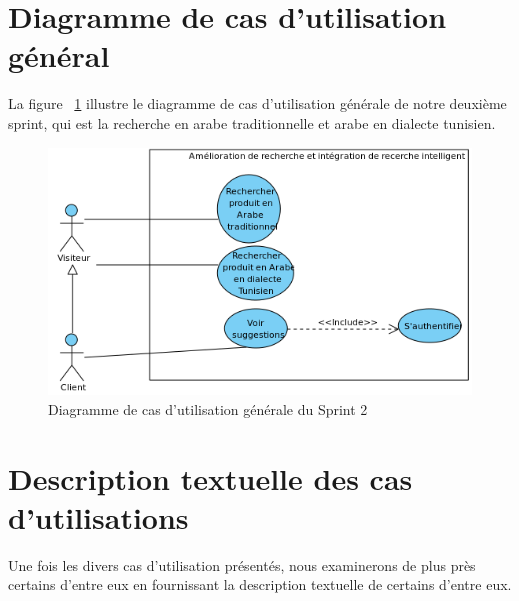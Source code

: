 \section{Diagramme de cas d'utilisation général}
\noindent
La figure ~\ref{fig:recherchearabe} illustre le diagramme de cas d'utilisation générale de notre deuxième sprint, qui est la recherche en arabe traditionnelle et arabe en dialecte tunisien.

\begin{figure}[H]
	\centering
	\includegraphics[width=1\textwidth]{logos/cusprint2.png}
	\caption{Diagramme de cas d'utilisation générale du Sprint 2}
	\label{fig:recherchearabe}
\end{figure}

\section{Description textuelle des cas d’utilisations}
Une fois les divers cas d'utilisation présentés, nous examinerons de plus près certains
d'entre eux en fournissant la description textuelle de certains d'entre eux.

\newpage
